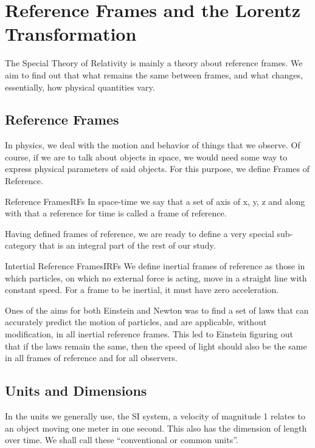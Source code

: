 \documentclass[12pt]{article}
\numberwithin{equation}{section}
\theoremstyle{plain}
\theoremstyle{definition}
\begin{document}
\section{Reference Frames and the Lorentz Transformation}

The Special Theory of Relativity is mainly a theory about reference frames. We aim to find out that what remains the same between frames, and what changes, essentially, how physical quantities vary.

\subsection{Reference Frames}
\label{sec:RFs}

In physics, we deal with the motion and behavior of things that we observe. Of course, if we are to talk about objects in space, we would need some way to express physical parameters of said objects. For this purpose, we define Frames of Reference.

\begin{defn}{Reference Frames}{RFs}
    In space-time we say that a set of axis of x, y, z and along with that a reference for time is called a frame of reference.
\end{defn}

Having defined frames of reference, we are ready to define a very special sub-category that is an integral part of the rest of our study.

\begin{defn}{Intertial Reference Frames}{IRFs}
    We define inertial frames of reference as those in which particles, on which no external force is acting, move in a straight line with constant speed. For a frame to be inertial, it must have zero acceleration.
\end{defn}

Ones of the aims for both Einstein and Newton was to find a set of laws that can accurately predict the motion of particles, and are applicable, without modification, in all inertial reference frames. This led to Einstein figuring out that if the laws remain the same, then the speed of light should also be the same in all frames of reference and for all observers.

\subsection*{Units and Dimensions}

In the units we generally use, the SI system, a velocity of magnitude 1 relates to an object moving one meter in one second. This also has the dimension of length over time. We shall call these ``conventional or common units''.
\end{document}
